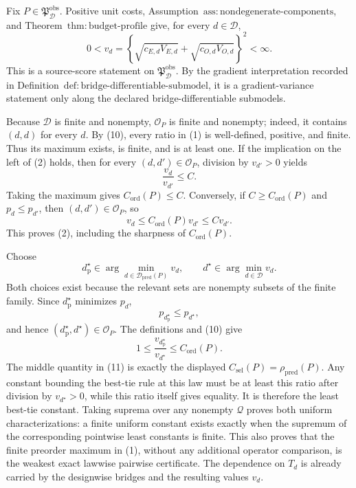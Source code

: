 Fix \(P\in\mathfrak P_{\mathcal D}^{\mathrm{obs}}\).  Positive unit costs, Assumption~\(\mathrm{ass{:}nondegenerate\text{-}components}\), and Theorem~\(\mathrm{thm{:}budget\text{-}profile}\) give, for every \(d\in\mathcal D\),
\[
 0<v_d
 =\left\{\sqrt{c_{E,d}V_{E,d}}+\sqrt{c_{O,d}V_{O,d}}\right\}^{2}
 <\infty.                                                     \tag{10}
\]
This is a source-score statement on \(\mathfrak P_{\mathcal D}^{\mathrm{obs}}\).  By the gradient interpretation recorded in Definition~\(\mathrm{def{:}bridge\text{-}differentiable\text{-}submodel}\), it is a gradient-variance statement only along the declared bridge-differentiable submodels.

Because \(\mathcal D\) is finite and nonempty, \(\mathcal O_P\) is finite and nonempty; indeed, it contains \((d,d)\) for every \(d\).  By (10), every ratio in (1) is well-defined, positive, and finite.  Thus its maximum exists, is finite, and is at least one.  If the implication on the left of (2) holds, then for every \((d,d')\in\mathcal O_P\), division by \(v_{d'}>0\) yields
\[
 \frac{v_d}{v_{d'}}\le C.
\]
Taking the maximum gives \(C_{\mathrm{ord}}(P)\le C\).  Conversely, if \(C\ge C_{\mathrm{ord}}(P)\) and \(p_d\le p_{d'}\), then \((d,d')\in\mathcal O_P\), so
\[
 v_d\le C_{\mathrm{ord}}(P)v_{d'}\le Cv_{d'}.
\]
This proves (2), including the sharpness of \(C_{\mathrm{ord}}(P)\).

Choose
\[
 d_{\mathrm p}^{\star}\in
 \arg\min_{d\in\mathcal D_{\mathrm{pred}}(P)}v_d,
 \qquad
 d^{\star}\in\arg\min_{d\in\mathcal D}v_d.
\]
Both choices exist because the relevant sets are nonempty subsets of the finite family.  Since \(d_{\mathrm p}^{\star}\) minimizes \(p_d\),
\[
 p_{d_{\mathrm p}^{\star}}\le p_{d^{\star}},
\]
and hence \((d_{\mathrm p}^{\star},d^{\star})\in\mathcal O_P\).  The definitions and (10) give
\[
 1
 \le \frac{v_{d_{\mathrm p}^{\star}}}{v_{d^{\star}}}
 \le C_{\mathrm{ord}}(P).                                   \tag{11}
\]
The middle quantity in (11) is exactly the displayed \(C_{\mathrm{sel}}(P)=\rho_{\mathrm{pred}}(P)\).  Any constant bounding the best-tie rule at this law must be at least this ratio after division by \(v_{d^{\star}}>0\), while this ratio itself gives equality.  It is therefore the least best-tie constant.  Taking suprema over any nonempty \(\mathcal Q\) proves both uniform characterizations: a finite uniform constant exists exactly when the supremum of the corresponding pointwise least constants is finite.  This also proves that the finite preorder maximum in (1), without any additional operator comparison, is the weakest exact lawwise pairwise certificate.  The dependence on \(T_d\) is already carried by the designwise bridges and the resulting values \(v_d\).

